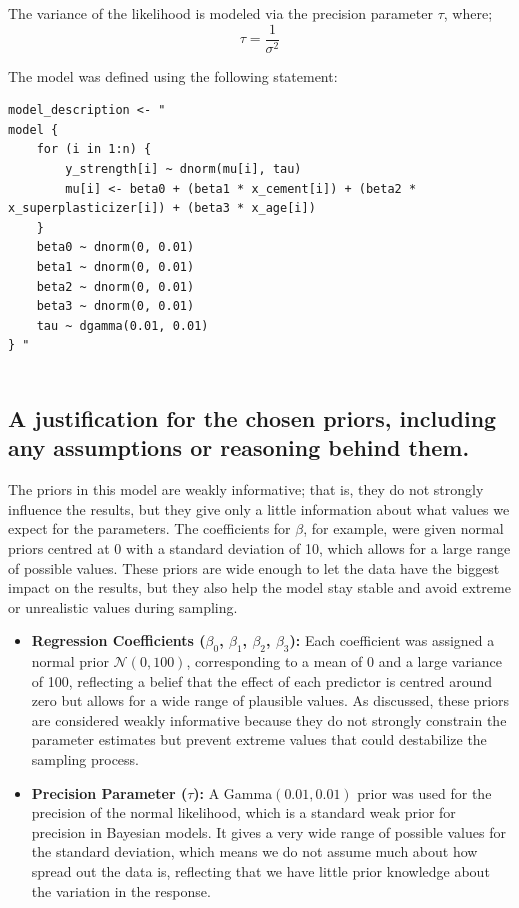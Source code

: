 \documentclass[]{article}
\begin{document}
The variance of the likelihood is modeled via the precision parameter $\tau$, where;
$$
\tau = \frac{1}{\sigma^2}
$$

The model was defined using the following statement:

\begin{lstlisting}
model_description <- "
model {
	for (i in 1:n) {
		y_strength[i] ~ dnorm(mu[i], tau)
		mu[i] <- beta0 + (beta1 * x_cement[i]) + (beta2 * x_superplasticizer[i]) + (beta3 * x_age[i])
	}
	beta0 ~ dnorm(0, 0.01)
	beta1 ~ dnorm(0, 0.01)
	beta2 ~ dnorm(0, 0.01)
	beta3 ~ dnorm(0, 0.01)
	tau ~ dgamma(0.01, 0.01)
} "
		
\end{lstlisting}



\subsection{A justification for the chosen priors, including any assumptions or reasoning behind
them.}


The priors in this model are weakly informative; that is, they do not strongly influence the results, but they give only a little information about what values we expect for the parameters. The coefficients for $\beta$, for example, were given normal priors centred at 0 with a standard deviation of 10, which allows for a large range of possible values. These priors are wide enough to let the data have the biggest impact on the results, but they also help the model stay stable and avoid extreme or unrealistic values during sampling.

\begin{itemize}
	\item \textbf{Regression Coefficients ($\beta_0$, $\beta_1$, $\beta_2$, $\beta_3$):} Each coefficient was assigned a normal prior $\mathcal{N}(0, 100)$, corresponding to a mean of 0 and a large variance of 100, reflecting a belief that the effect of each predictor is centred around zero but allows for a wide range of plausible values. As discussed, these priors are considered weakly informative because they do not strongly constrain the parameter estimates but prevent extreme values that could destabilize the sampling process.
	
	\item \textbf{Precision Parameter ($\tau$):} A Gamma$(0.01, 0.01)$ prior was used for the precision of the normal likelihood, which is a standard weak prior for precision in Bayesian models. It gives a very wide range of possible values for the standard deviation, which means we do not assume much about how spread out the data is, reflecting that we have little prior knowledge about the variation in the response.
\end{itemize}
\end{document}
